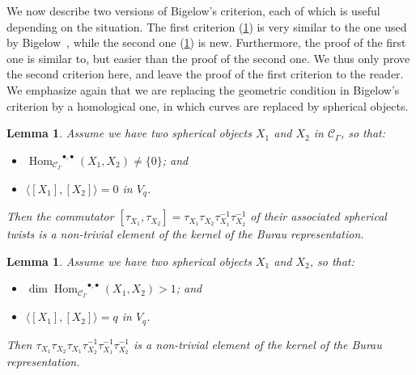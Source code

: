 \documentclass[a4paper]{amsart}
\newcommand{\0}{\mathbf{0}}
\DeclareMathOperator{\Hom}{Hom}
\newcommand{\HOM}{\ensuremath{\Hom_{\mathcal{C}_\Gamma}}}
\theoremstyle{theorem}
\newtheorem{lemma}[theorem]{Lemma}
\begin{document}
We now describe two versions of Bigelow's criterion, each of which is useful depending on the situation.
The first criterion (\cref{lem:CatBigelow1}) is very similar to the one used by Bigelow~\cite[Theorem 1.4]{Bigelow_Burau}, while the second one (\cref{lem:CatBigelow2}) is new.
Furthermore, the proof of the first one is similar to, but easier than the proof of the second one. 
We thus only prove the second criterion here, and leave the proof of the first criterion to the reader.
We emphasize again that we are replacing the geometric condition in Bigelow's criterion by a homological one, in which curves are replaced by spherical objects.

\begin{lemma}\label{lem:CatBigelow1}
  Assume we have two spherical objects $X_1$ and $X_2$ in \(\mathcal{C}_{\Gamma}\), so that:
  \begin{itemize}
  \item $\HOM^{\bullet,\bullet}(X_1,X_2)\neq \{0\}$; and 
  \item $\langle [X_1],[X_2]\rangle =0$ in $V_q$.
  \end{itemize}
  Then the commutator $[\tau_{X_1},\tau_{X_2}] = \tau_{X_1} \tau_{X_2} \tau_{X_1}^{-1} \tau_{X_2}^{-1}$ of their associated spherical twists is a non-trivial element of the kernel of the Burau representation.
\end{lemma}

\begin{lemma}\label{lem:CatBigelow2}
  Assume we have two spherical objects $X_1$ and $X_2$, so that:
  \begin{itemize}
  \item $\dim \HOM^{\bullet,\bullet}(X_1,X_2) > 1$; and 
  \item $\langle [X_1],[X_2]\rangle = q$ in $V_q$.
  \end{itemize}
  Then $\tau_{X_1}\tau_{X_2}\tau_{X_1}\tau_{X_2}^{-1}\tau_{X_1}^{-1}\tau_{X_2}^{-1}$ is a non-trivial element of the kernel of the Burau representation.
\end{lemma}
\end{document}
